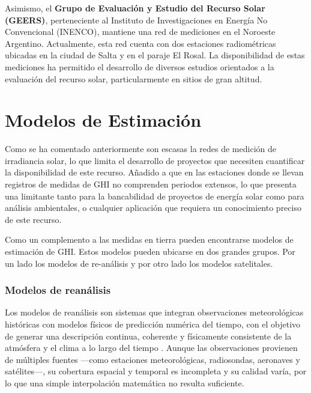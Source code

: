 \documentclass[letterpaper,12pt, twoside]{report}
\providecommand{\DIFdeltex}[1]{{\protect\color{red} \scriptsize #1}} %
\providecommand{\DIFdel}[1]{\texorpdfstring{\DIFdeltex{#1}}{}} %
\begin{document}
\DIFdel{Asimismo, el \textbf{Grupo de Evaluación y Estudio del Recurso Solar (GEERS)}, perteneciente al Instituto de Investigaciones en Energía No Convencional (INENCO), mantiene una red de mediciones en el Noroeste Argentino. Actualmente, esta red cuenta con dos estaciones radiométricas ubicadas en la ciudad de Salta y en el paraje El Rosal. La disponibilidad de estas mediciones ha permitido el desarrollo de diversos estudios orientados a la evaluación del recurso solar, particularmente en sitios de gran altitud.
}%

\section{\DIFdel{Modelos de Estimación}} %
\addtocounter{section}{-1}%

\DIFdel{Como se ha comentado anteriormente son escasas la redes de medición de irradiancia solar, lo que limita el desarrollo de proyectos que necesiten cuantificar la disponibilidad de este recurso. Añadido a que en las estaciones donde se llevan registros de medidas de GHI no comprenden periodos extensos, lo que presenta una limitante tanto para la bancabilidad de proyectos de energía solar como para análisis ambientales, o cualquier aplicación que requiera un conocimiento preciso de este recurso.}%

\DIFdel{Como un complemento a las medidas en tierra pueden encontrarse modelos de estimación de GHI. Estos modelos pueden ubicarse en dos grandes grupos. Por un lado los modelos de re-análisis y por otro lado los modelos satelitales.
}%

\subsubsection{\DIFdel{Modelos de reanálisis}}
\addtocounter{subsubsection}{-1}%

\DIFdel{Los modelos de reanálisis son sistemas que integran observaciones meteorológicas históricas con modelos físicos de predicción numérica del tiempo, con el objetivo de generar una descripción continua, coherente y físicamente consistente de la atmósfera y el clima a lo largo del tiempo \cite{Thejll2015}. Aunque las observaciones provienen de múltiples fuentes —como estaciones meteorológicas, radiosondas, aeronaves y satélites—, su cobertura espacial y temporal es incompleta y su calidad varía, por lo que una simple interpolación matemática no resulta suficiente.
}%
\end{document}
